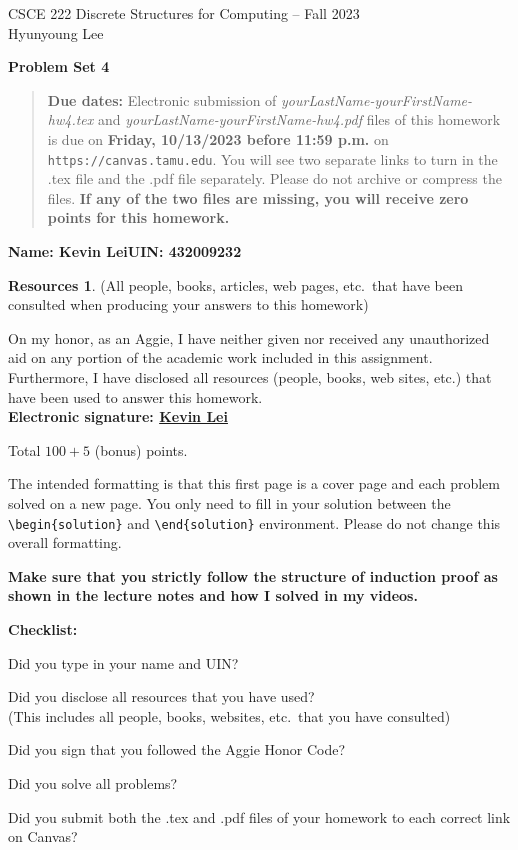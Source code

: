 \documentclass{article}
\theoremstyle{definition}
\newtheorem*{solution}{Solution}
\newtheorem*{resources}{Resources}
\newcommand{\name}[2]{\noindent\textbf{Name: #1}\hfill \textbf{UIN: #2}
  \newcommand{\myName}{#1}
  \newcommand{\myUIN}{#2}
}
\newcommand{\honor}{\noindent On my honor, as an Aggie, I have neither
  given nor received any unauthorized aid on any portion of the
  academic work included in this assignment. Furthermore, I have
  disclosed all resources (people, books, web sites, etc.) that have
  been used to answer this homework. \\[2ex]
 \textbf{Electronic signature: \underline{Kevin Lei} } } %
\newcommand{\checklist}{\noindent\textbf{Checklist:}
\begin{compactitem}[$\Box$] 
\item Did you type in your name and UIN? 
\item Did you disclose all resources that you have used? \\
(This includes all people, books, websites, etc.\ that you have consulted)
\item Did you sign that you followed the Aggie Honor Code? 
\item Did you solve all problems? 
\item Did you submit both the .tex and .pdf files of your homework to each correct link on Canvas? 
\end{compactitem}
}
\newcommand{\problemset}[1]{\begin{center}\textbf{Problem Set #1}\end{center}}
\newcommand{\duedate}[1]{\begin{quote}\textbf{Due dates:} Electronic
    submission of \textsl{yourLastName-yourFirstName-hw4.tex} and 
    \textsl{yourLastName-yourFirstName-hw4.pdf} files of this homework is due on
    \textbf{#1} on \texttt{https://canvas.tamu.edu}. You will see two separate links
    to turn in the .tex file and the .pdf file separately. Please do not archive or compress the files.  
    \textbf{If any of the two files are missing, you will receive zero points for this homework.}\end{quote} }
\begin{document}
\begin{center}
{\large
CSCE 222 Discrete Structures for Computing -- Fall 2023\\[.5ex]
Hyunyoung Lee\\}
\end{center}
\problemset{4}
\duedate{Friday, 10/13/2023 before 11:59 p.m.}
\name{Kevin Lei}{432009232} %

\begin{resources} (All people, books, articles, web pages, etc.\ that
  have been consulted when producing your answers to this homework)
\end{resources}
\honor

\bigskip

\noindent
Total $100+5$ (bonus) points.

\bigskip

\noindent
The intended formatting is that this first page is a cover page and each 
problem solved on a new page. You only need to fill in your solution between 
the \verb|\begin{solution}| and \verb|\end{solution}| environment.  
Please do not change this overall formatting.

\bigskip

\noindent
\textbf{Make sure that you strictly follow the structure of induction proof as shown in the 
lecture notes and how I solved in my videos.}

\vfill
\checklist
\end{document}
